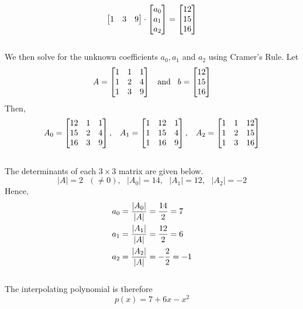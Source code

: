 \documentclass[12pt]{amsart}
\begin{document}
\begin{enumerate}
\begin{align}
\begin{bmatrix}
				1 &3 &9 
			\end{bmatrix} \cdot
			\begin{bmatrix}
				a_0 \\
				a_1 \\
				a_2
			\end{bmatrix} =
			\begin{bmatrix}
				12 \\
				15 \\
				16
			\end{bmatrix}  \notag
		\end{align} \\
		We then solve for the unknown coefficients $a_0, a_1$ and $a_2$ using Cramer's Rule. Let 
		\begin{align}
			A=
			\begin{bmatrix}
				1 &1 &1 \\
				1 &2 &4 \\
				1 &3 &9 
			\end{bmatrix} \hspace{0.3cm} \text{and} \hspace{0.3cm} b=
			\begin{bmatrix}
				12 \\
				15 \\
				16
			\end{bmatrix}  \notag
		\end{align}
		Then,
		\begin{align}
		A_0=
			\begin{bmatrix}
				12 &1 &1 \\
				15 &2 &4 \\
				16 &3 &9 
			\end{bmatrix}, \hspace{0.3cm} A_1=
			\begin{bmatrix}
				1 &12 &1 \\
				1 &15 &4 \\
				1 &16 &9 
			\end{bmatrix}, \hspace{0.3cm} A_2=
			\begin{bmatrix}
				1 &1 &12 \\
				1 &2 &15 \\
				1 &3 &16
			\end{bmatrix} \notag
		\end{align} \\
		The determinants of each $3\times3$ matrix are given below. \\
		$$|A|=2 \text{ } (\ne0), \text{ } |A_0|=14,  \text{ } |A_1|=12, \text{ } |A_2|=-2$$
		Hence,
		\begin{align}
			a_0&=\frac{|A_0|}{|A|}=\frac{14}{2}=7 \notag \\
			a_1&=\frac{|A_1|}{|A|}=\frac{12}{2}=6 \notag \\
			a_2&=\frac{|A_2|}{|A|}=-\frac{2}{2}=-1 \notag
		\end{align} \\
		The interpolating polynomial is therefore
		$$p(x)=7+6x-x^2$$
		
\end{enumerate}
	
\end{document}
